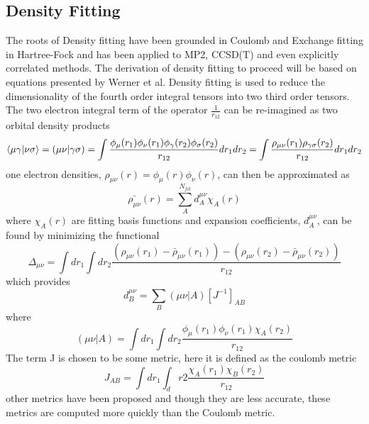 	\subsection{Density Fitting}
		The roots of Density fitting have been grounded in Coulomb\cite{Ten-no 1995, Vahtras 1993} and Exchange\cite{Weigend 2002} fitting in Hartree-Fock and has been applied to MP2\cite{Feyereisen 1993}, CCSD(T)\cite{Rendell 1994} and even explicitly correlated methods\cite{Manby 2003}.  The derivation of density fitting to proceed will be based on equations presented by Werner et al.\cite{Werner 2003} Density fitting is used to reduce the dimensionality of the fourth order integral tensors into two third order tensors. The two electron integral term of the operator $\frac{1}{r_{12}}$ can be re-imagined as two orbital density products
			\begin{equation}
			\langle\mu\gamma|\nu\sigma\rangle = (\mu\nu|\gamma\sigma) = \int\frac{\phi_\mu(r_1) \phi_\nu(r_1) \phi_\gamma(r_2)\phi_\sigma(r_2)}{r_{12}} dr_1 dr_2
			= \int \frac{\rho_{\mu\nu}(r_1)\rho_{\gamma\sigma}(r_2)}{r_{12}}dr_1 dr_2
			\end{equation}
		one electron densities, $\rho_{\mu\nu}(r) = \phi_\mu(r) \phi_\nu(r)$, can then be approximated as 
			\begin{equation}
				\bar{\rho_{\mu\nu}}(r) = \sum_A^{N_{fit}} d^{\mu\nu}_A \chi_A(r)
			\end{equation}
		where $\chi_A(r)$ are fitting basis functions and expansion coefficients, $d^{\mu\nu}_A$, can be found by minimizing the functional 
			\begin{equation}
				\Delta_{\mu\nu} = \int dr_1 \int dr_2 \frac{(\rho_{\mu\nu}(r_1)-\bar{\rho}_{\mu\nu}(r_1)) - (\rho_{\mu\nu}(r_2) - \bar{\rho}_{\mu\nu}(r_2))}{r_{12}}
			\end{equation}
		which provides 
			\begin{equation}
				d^{\mu\nu}_B = \sum_B (\mu\nu|A)[J^{-1}]_{AB}
			\end{equation}
		where 
			\begin{equation}
				(\mu\nu|A) = \int dr_1 \int dr_2 \frac{\phi_\mu(r_1)\phi_\nu(r_1)\chi_A(r_2)}{r_{12}}
			\end{equation}
		The term J is chosen to be some metric, here it is defined as the coulomb metric\cite{Dunlap 1977, Dunlap 1979}
			\begin{equation}
				J_{AB} = \int dr_1 \int_dr2 \frac{\chi_A(r_1) \chi_B(r_2)}{r_{12}}
			\end{equation}
		other metrics have been proposed\cite{Baerends 1973} and though they are less accurate, these metrics are computed more quickly than the Coulomb metric.\\
